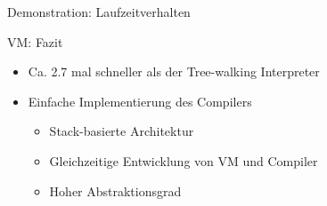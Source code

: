\begin{frame}{Demonstration: Laufzeitverhalten}
	\begin{figure}[H]
		\href{run:assets/01_rush_presentation_vm.mkv}{
		}
	\end{figure}
\end{frame}

\begin{frame}{VM: Fazit}
	\begin{itemize}
		\item Ca. 2.7 mal schneller als der Tree-walking Interpreter
		\item Einfache Implementierung des Compilers
		      \begin{itemize}
			      \item  Stack-basierte Architektur
			      \item Gleichzeitige Entwicklung von VM und Compiler
			      \item Hoher Abstraktionsgrad
		      \end{itemize}
	\end{itemize}
\end{frame}
